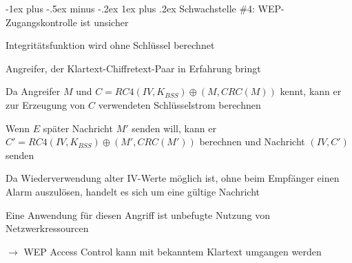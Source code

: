 \documentclass[a4paper]{article}
\makeatletter
\renewcommand{\subsubsection}{\@startsection{subsubsection}{3}{0mm}%
 {-1ex plus -.5ex minus -.2ex}%
 {1ex plus .2ex}%
 {\normalfont\small\bfseries}}
\makeatother
\begin{document}
\begin{multicols}{3}
      \subsubsection{Schwachstelle \#4: WEP-Zugangskontrolle ist unsicher}
      \begin{itemize*}
            \item Integritätsfunktion wird ohne Schlüssel berechnet
            \item Angreifer, der Klartext-Chiffretext-Paar in Erfahrung bringt
            \item Da Angreifer $M$ und $C=RC4(IV, K_{BSS})\oplus (M, CRC(M))$ kennt, kann er zur Erzeugung von $C$ verwendeten Schlüsselstrom berechnen
            \item Wenn $E$ später Nachricht $M'$ senden will, kann er $C' = RC4(IV, K_{BSS})\oplus (M', CRC(M'))$ berechnen und Nachricht $(IV, C')$ senden
            \item Da Wiederverwendung alter IV-Werte möglich ist, ohne beim Empfänger einen Alarm auszulösen, handelt es sich um eine gültige Nachricht
            \item Eine Anwendung für diesen Angriff ist unbefugte Nutzung von Netzwerkressourcen
            \item[$\rightarrow$] WEP Access Control kann mit bekanntem Klartext umgangen werden
      \end{itemize*}


\end{multicols}
\end{document}
